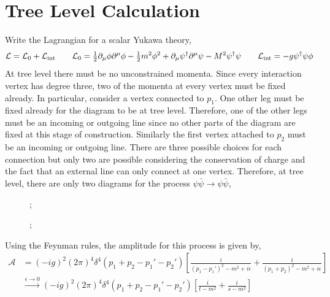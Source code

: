 \documentclass{article}
\begin{document}

\section{Tree Level Calculation}

Write the Lagrangian for a scalar Yukawa theory,
\[ \mathcal{L} = \mathcal{L}_0 + \mathcal{L}_{\mathrm{int}} \quad \quad \mathcal{L}_0 = \tfrac{1}{2} \partial_\mu \phi \partial^\mu \phi - \tfrac{1}{2} m^2 \phi^2 + \partial_\mu \psi^\dagger \partial^\mu \psi - M^2 \psi^\dagger \psi \quad \quad \mathcal{L}_{\mathrm{int}} = -g \psi^\dagger \psi \phi \] 
At tree level there must be no unconstrained momenta. Since every interaction vertex has degree three, two of the momenta at every vertex must be fixed already. In particular, consider a vertex connected to $p_1$. One other leg must be fixed already for the diagram to be at tree level. Therefore, one of the other legs must be an incoming or outgoing line since no other parts of the diagram are fixed at this stage of construction. Similarly the first vertex attached to $p_2$ must be an incoming or outgoing line. There are three possible choices for each connection but only two are possible considering the conservation of charge and the fact that an external line can only connect at one vertex. Therefore, at tree level, there are only two diagrams for the process $\psi \bar{\psi} \to \psi \bar{\psi}$,
\begin{figure}
\centering
\begin{minipage}{.5\textwidth}
  \centering
  
;

\end{minipage}%
\begin{minipage}{.5\textwidth}
  \centering
  
;

\end{minipage}
\end{figure}
Using the Feynman rules, the amplitude for this process is given by,
\begin{align*}
\mathcal{A} & = (- i g)^2 (2 \pi)^4 \delta^4(p_1 + p_2 - p_1' - p_2') \left[ \frac{i}{(p_1 - p_1')^2 - m^2 + i \epsilon} + \frac{i}{(p_1 + p_2)^2 - m^2 + i \epsilon} \right]
\\
& \xrightarrow{\epsilon \to 0} (- i g)^2 (2 \pi)^4 \delta^4(p_1 + p_2 - p_1' - p_2') \left[ \frac{i}{t - m^2} + \frac{i}{s - m^2} \right]
\end{align*}
\end{document}
